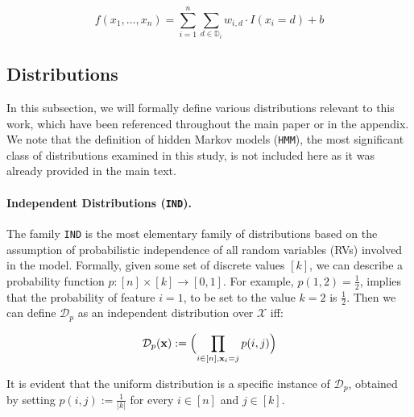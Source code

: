 $$f(x_{1}, \ldots , x_{n}) = \sum\limits_{i=1}^{n} \sum\limits_{d \in \mathbb{D}_{i}} w_{i,d} \cdot I(x_{i}=d) + b$$



\subsection{Distributions}
In this subsection, we will formally define various distributions relevant to this work, which have been referenced throughout the main paper or in the appendix. We note that the definition of hidden Markov models (\texttt{HMM}), the most significant class of distributions examined in this study, is not included here as it was already provided in the main text.

\paragraph{Independent Distributions (\texttt{IND}).} The family \texttt{IND} is the most elementary family of distributions based on the assumption of probabilistic independence of all random variables (RVs) involved in the model. Formally, given some set of discrete values $[k]$, we can describe a probability function $p:[n]\times [k]\to [0,1]$. For example, $p(1,2)=\frac{1}{2}$, implies that the probability of feature $i=1$, to be set to the value $k=2$ is $\frac{1}{2}$. Then we can define $\mathcal{D}_p$ as an independent distribution over $\mathcal{X}$ iff:

\begin{equation}
    \label{eq:explanation}
    \mathcal{D}_p(\textbf{x}):=\Big({\displaystyle \prod_{i\in [n], \textbf{x}_i=j} p(i, j)}\Big)
\end{equation}

It is evident that the uniform distribution is a specific instance of $\mathcal{D}_p$, obtained by setting $p(i,j):=\frac{1}{|k|}$ for every $i \in [n]$ and $j \in [k]$.

